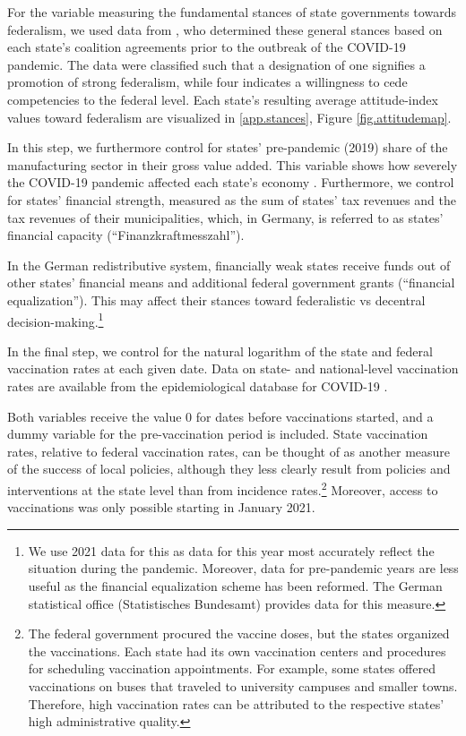 \documentclass[authoryear,12pt, 3p]{elsarticle}
\theoremstyle{break}
\begin{document}
For the variable measuring the fundamental stances of state governments towards federalism, we used data from \cite{BarbaroRode2024}, who determined these general stances based on each state's coalition agreements prior to the outbreak of the COVID-19 pandemic. The data were classified such that a designation of one signifies a promotion of strong federalism, while four indicates a willingness to cede competencies to the federal level. Each state's resulting average attitude-index values toward federalism are visualized in \ref{app.stances}, Figure \ref{fig.attitudemap}. 

In this step, we furthermore control for states’ pre-pandemic (2019) share of the manufacturing sector in their gross value added. This variable shows how severely the COVID-19 pandemic affected each state's economy \citep{Flach2020}. Furthermore, we control for states’ financial strength, measured as the sum of states’ tax revenues and the tax revenues of their municipalities, which, in Germany, is referred to as states’ financial capacity (“Finanzkraftmesszahl”). 

In the German redistributive system, financially weak states receive funds out of other states' financial means and additional federal government grants (“financial equalization”). This may affect their stances toward federalistic vs decentral decision-making.\footnote{
	We use 2021 data for this as data for this year most accurately reflect the situation during the pandemic. Moreover, data for pre-pandemic years are less useful as the financial equalization scheme has been reformed. The German statistical office (Statistisches Bundesamt) provides data for this measure.
}  

In the final step, we control for the natural logarithm of the state and federal vaccination rates at each given date. Data on state- and national-level vaccination rates are available from the epidemiological database for COVID-19 \citep{Guidotti2022}. 

Both variables receive the value $0$ for dates before vaccinations started, and a dummy variable for the pre-vaccination period is included. State vaccination rates, relative to federal vaccination rates, can be thought of as another measure of the success of local policies, although they less clearly result from policies and interventions at the state level than from incidence rates.\footnote{
	The federal government procured the vaccine doses, but the states organized the vaccinations. Each state had its own vaccination centers and procedures for scheduling vaccination appointments. For example, some states offered vaccinations on buses that traveled to university campuses and smaller towns. Therefore, high vaccination rates can be attributed to the respective states' high administrative quality.
} Moreover, access to vaccinations was only possible starting in January 2021.  
\end{document}
